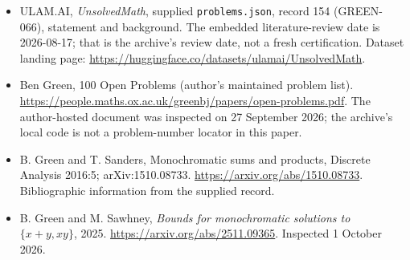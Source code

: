 \documentclass[11pt,a4paper]{article}
\begin{document}
{\small

\begin{itemize}

\item[\hypertarget{source:154:1}{S1}] ULAM.AI, \emph{UnsolvedMath}, supplied \texttt{problems.json}, record 154 (GREEN-066), statement and background. The embedded literature-review date is 2026-08-17; that is the archive’s review date, not a fresh certification. Dataset landing page: \url{https://huggingface.co/datasets/ulamai/UnsolvedMath}.

\item[\hypertarget{source:154:2}{S2}] Ben Green, 100 Open Problems (author’s maintained problem list). \url{https://people.maths.ox.ac.uk/greenbj/papers/open-problems.pdf}. The author-hosted document was inspected on 27 September 2026; the archive’s local code is not a problem-number locator in this paper.

\item[\hypertarget{source:154:3}{S3}] B. Green and T. Sanders, Monochromatic sums and products, Discrete Analysis 2016:5; arXiv:1510.08733. \url{https://arxiv.org/abs/1510.08733}. Bibliographic information from the supplied record.

\item[E1] B. Green and M. Sawhney, \emph{Bounds for monochromatic solutions to $\{x+y,xy\}$}, 2025. \url{https://arxiv.org/abs/2511.09365}. Inspected 1 October 2026.

\end{itemize}

}

\label{end:154}
\end{document}
